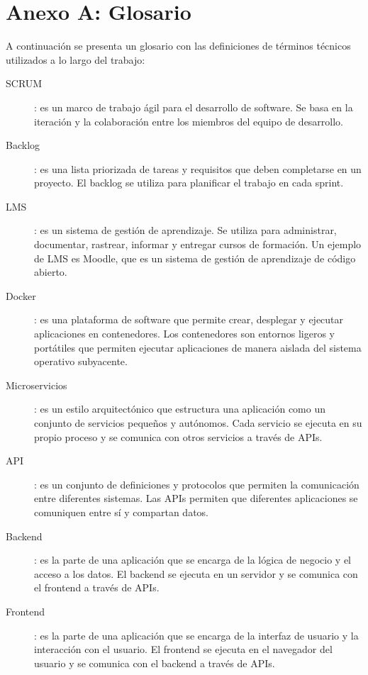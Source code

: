 \chapter*{Anexo A: Glosario}

A continuación se presenta un glosario con las definiciones de términos técnicos utilizados a lo largo del trabajo:

\begin{description}
    \item [\hypertarget{scrum}{SCRUM}]: es un marco de trabajo ágil para el desarrollo de software. Se basa en la iteración y la colaboración entre los miembros del equipo de desarrollo.
    \item [\hypertarget{backlog}{Backlog}]: es una lista priorizada de tareas y requisitos que deben completarse en un proyecto. El backlog se utiliza para planificar el trabajo en cada sprint.
    \item [\hypertarget{lms}{LMS}]: es un sistema de gestión de aprendizaje. Se utiliza para administrar, documentar, rastrear, informar y entregar cursos de formación. Un ejemplo de LMS es Moodle, que es un sistema de gestión de aprendizaje de código abierto.
    \item [\hypertarget{docker}{Docker}]: es una plataforma de software que permite crear, desplegar y ejecutar aplicaciones en contenedores. Los contenedores son entornos ligeros y portátiles que permiten ejecutar aplicaciones de manera aislada del sistema operativo subyacente.
    \item [\hypertarget{microservicios}{Microservicios}]: es un estilo arquitectónico que estructura una aplicación como un conjunto de servicios pequeños y autónomos. Cada servicio se ejecuta en su propio proceso y se comunica con otros servicios a través de APIs.
    \item [\hypertarget{api}{API}]: es un conjunto de definiciones y protocolos que permiten la comunicación entre diferentes sistemas. Las APIs permiten que diferentes aplicaciones se comuniquen entre sí y compartan datos.
    \item [\hypertarget{backend}{Backend}]: es la parte de una aplicación que se encarga de la lógica de negocio y el acceso a los datos. El backend se ejecuta en un servidor y se comunica con el frontend a través de APIs.
    \item [\hypertarget{frontend}{Frontend}]: es la parte de una aplicación que se encarga de la interfaz de usuario y la interacción con el usuario. El frontend se ejecuta en el navegador del usuario y se comunica con el backend a través de APIs.

\end{description}
